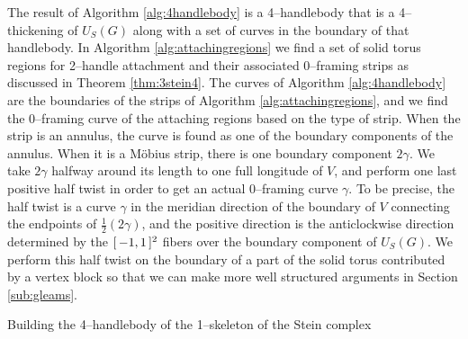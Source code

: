 The result of Algorithm \ref{alg:4handlebody} is a 4--handlebody that is a 4--thickening of $U_S(G)$ along with a set of curves in the boundary of that handlebody.
In Algorithm \ref{alg:attachingregions} we find a set of solid torus regions for 2--handle attachment and their associated 0--framing strips as discussed in Theorem \ref{thm:3stein4}.
The curves of Algorithm \ref{alg:4handlebody} are the boundaries of the strips of Algorithm \ref{alg:attachingregions}, and we find the 0--framing curve of the attaching regions based on the type of strip.
When the strip is an annulus, the curve is found as one of the boundary components of the annulus.
When it is a M\"obius strip, there is one boundary component $2\gamma$.
We take $2\gamma$ halfway around its length to one full longitude of $V$, and perform one last positive half twist in order to get an actual 0--framing curve $\gamma$.
To be precise, the half twist is a curve $\gamma$ in the meridian direction of the boundary of $V$ connecting the endpoints of $\frac{1}{2}(2\gamma)$, and the positive direction is the anticlockwise direction determined by the $[\,-1,1\,]^2$ fibers over the boundary component of $U_S(G)$.
We perform this half twist on the boundary of a part of the solid torus contributed by a vertex block so that we can make more well structured arguments in Section \ref{sub:gleams}.

\begin{algorithm}
	\caption{Building the 4--handlebody of the 1--skeleton of the Stein complex}
	\label{alg:4handlebody}
\end{algorithm}		
		
